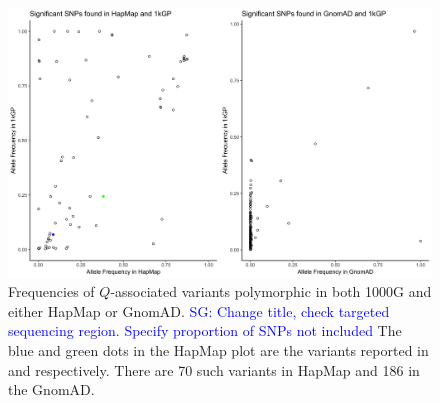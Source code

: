 \documentclass[9pt,lineno]{elife}
\newcommand{\sgcomment}[1]{\textcolor{blue}{SG: #1}}
\begin{document}
\begin{figure}[h]
\includegraphics[width=\hsize,keepaspectratio]{./Figures/Hap_GnomAD.jpg}
\caption{Frequencies of $Q$-associated variants polymorphic in both 1000G and either HapMap or GnomAD. \sgcomment{Change title, check targeted  sequencing region. Specify proportion of SNPs not included} The blue and green dots in the HapMap plot are the variants reported in \citep{Mandage2017} and \citep{Kraja2011} respectively. There are 70 such variants in HapMap and 186 in the GnomAD.}
\label{HapMap_GnomAD}
\end{figure}
\end{document}

